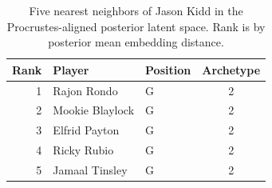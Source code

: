 \begin{table}[htbp]
  \centering\small
  \begin{tabular}{rllc}
    \toprule
    Rank & Player & Position & Archetype \\
    \midrule
    1 & Rajon Rondo & G & 2 \\
    2 & Mookie Blaylock & G & 2 \\
    3 & Elfrid Payton & G & 2 \\
    4 & Ricky Rubio & G & 2 \\
    5 & Jamaal Tinsley & G & 2 \\
    \bottomrule
  \end{tabular}
  \caption{Five nearest neighbors of Jason Kidd in the Procrustes-aligned posterior latent space. Rank is by posterior mean embedding distance.}
  \label{tab:Jason_Kidd_neighbors}
\end{table}

